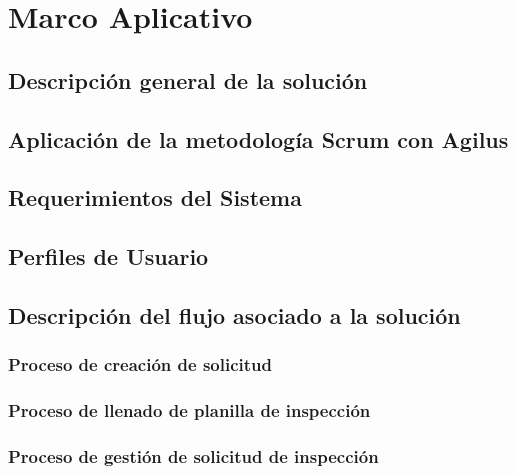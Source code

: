 \chapter{Marco Aplicativo}


\section{Descripción general de la solución} 
\setlength{\parskip}{5mm}
\setlength{\parskip}{0mm}


\section{Aplicación de la metodología Scrum con Agilus } 
\setlength{\parskip}{5mm}
\setlength{\parskip}{0mm}


\section{Requerimientos del Sistema } 
\setlength{\parskip}{5mm}
\setlength{\parskip}{0mm}


\section{Perfiles de Usuario} 
\setlength{\parskip}{5mm}
\setlength{\parskip}{0mm}


\section{Descripción del flujo asociado a la solución} 
\setlength{\parskip}{5mm}
\setlength{\parskip}{0mm}

\subsection{Proceso de creación de solicitud}
\setlength{\parskip}{5mm}
\setlength{\parskip}{0mm}

\subsection{Proceso de llenado de planilla de inspección}
\setlength{\parskip}{5mm}
\setlength{\parskip}{0mm}

\subsection{Proceso de gestión de solicitud de inspección}
\setlength{\parskip}{5mm}
\setlength{\parskip}{0mm}


